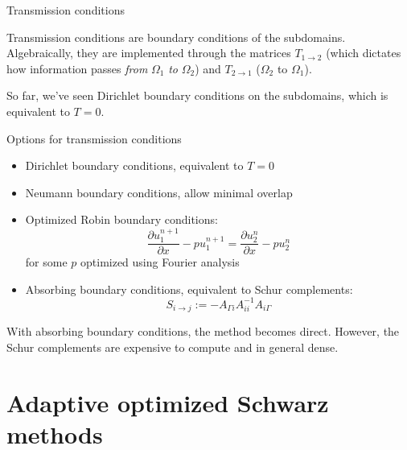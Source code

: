 \documentclass{beamer}
\begin{document}
\begin{frame}{Transmission conditions}

Transmission conditions are boundary conditions of the subdomains.
Algebraically, they are implemented through the matrices $T_{1 \to 2}$ (which dictates how information passes \textit{from} $\Omega_1$ \textit{to} $\Omega_2$) and $T_{2 \to 1}$ ($\Omega_2$ to $\Omega_1$).

So far, we've seen Dirichlet boundary conditions on the subdomains, which is equivalent to $T=0$.

\end{frame}

\begin{frame}{Options for transmission conditions}

\begin{itemize}
\item Dirichlet boundary conditions, equivalent to $T=0$
\item Neumann boundary conditions, allow minimal overlap
\item Optimized Robin boundary conditions:
\begin{equation*}
	\frac{\partial u_1^{n+1}}{\partial x} - p u_1^{n+1} = \frac{\partial u_2^{n}}{\partial x} - p u_2^{n}
\end{equation*}
for some $p$ optimized using Fourier analysis
\item Absorbing boundary conditions, equivalent to Schur complements:
\begin{equation*}
	S_{i \to j} := -A_{\Gamma i} A_{ii}^{-1} A_{i \Gamma}
\end{equation*}
\end{itemize}
With absorbing boundary conditions, the method becomes direct.
However, the Schur complements are expensive to compute and in general dense.

\end{frame}





\section{Adaptive optimized Schwarz methods} %
\end{document}
